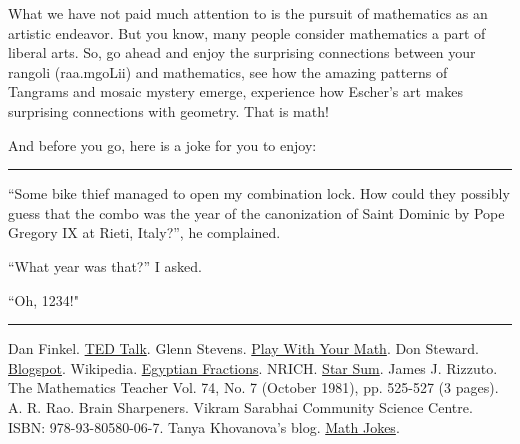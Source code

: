 \documentclass[12pt]{exam}         %
\begin{document}
What we have not paid much attention to is the pursuit of mathematics as an artistic endeavor. But you know, many people consider mathematics a part of liberal arts. So, go ahead and enjoy the surprising connections between your rangoli (\textmarathi{raa.mgoLii}) and mathematics, see how the amazing patterns of Tangrams and mosaic mystery emerge, experience how Escher's art makes surprising connections with geometry. That is math!

And before you go, here is a joke for you to enjoy:

\par\noindent\rule{\textwidth}{0.4pt}
``Some bike thief managed to open my combination lock. How could they possibly guess that the combo was the year of the canonization of Saint Dominic by Pope Gregory IX at Rieti, Italy?'', he complained.

``What year was that?'' I asked.

``Oh, 1234!"

\faSmileO

\par\noindent\rule{\textwidth}{0.4pt}

\newpage
\begin{thebibliography}{00}
     Dan Finkel. \href{https://www.ted.com/talks/dan_finkel_5_ways_to_share_math_with_kids/transcript?language=en}{TED Talk}.
     Glenn Stevens. \href{https://playwithyourmath.com/2020/02/09/24-plus-minus/}{Play With Your Math}.
     Don Steward. \href{https://donsteward.blogspot.com/}{Blogspot}.
     Wikipedia. \href{https://en.wikipedia.org/wiki/Egyptian_fraction}{Egyptian Fractions}.
     NRICH. \href{https://nrich.maths.org/2206}{Star Sum}.
     James J. Rizzuto.  The Mathematics Teacher Vol. 74, No. 7 (October 1981), pp. 525-527 (3 pages).
     A. R. Rao. Brain Sharpeners. Vikram Sarabhai Community Science Centre. ISBN: 978-93-80580-06-7.
     Tanya Khovanova's blog. \href{https://blog.tanyakhovanova.com/category/math-humor/page/2/}{Math Jokes}.
\end{thebibliography}
\end{document}
